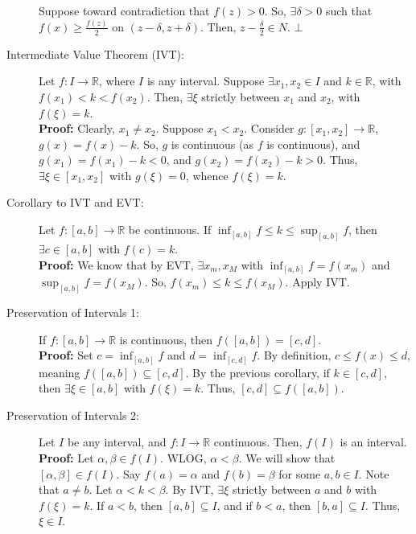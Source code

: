 \documentclass[10pt]{extarticle}
\newcommand{\R}{\mathbb{R}}
\begin{document}
\begin{description}
        Suppose toward contradiction that $f(z) > 0$. So, $\exists \delta > 0$ such that $f(x) \geq \frac{f(z)}{2}$ on $(z-\delta,z+\delta)$. Then, $z-\frac{\delta}{2}\in N$. $\bot$
      \item[Intermediate Value Theorem (IVT):] Let $f: I \rightarrow \R$, where $I$ is any interval. Suppose $\exists x_1,x_2\in I$ and $k\in \R$, with $f(x_1) < k < f(x_2)$. Then, $\exists \xi$ strictly between $x_1$ and $x_2$, with $f(\xi) = k$.\\

        \textbf{Proof:} Clearly, $x_1 \neq x_2$. Suppose $x_1 < x_2$. Consider $g: [x_1,x_2] \rightarrow \R$, $g(x) = f(x) - k$. So, $g$ is continuous (as $f$ is continuous), and $g(x_1) = f(x_1) - k < 0$, and $g(x_2) = f(x_2) - k > 0$. Thus, $\exists \xi \in [x_1,x_2]$ with $g(\xi) = 0$, whence $f(\xi) = k$.
      \item[Corollary to IVT and EVT:] Let $f: [a,b]\rightarrow \R$ be continuous. If $\inf_{[a,b]} f \leq k\leq \sup_{[a,b]} f$, then $\exists c\in [a,b]$ with $f(c) = k$.\\

        \textbf{Proof:} We know that by EVT, $\exists x_m,x_M$ with $\inf_{[a,b]} f = f(x_m)$ and $\sup_{[a,b]} f = f(x_M)$. So, $f(x_m) \leq k \leq f(x_M)$. Apply IVT.
      \item[Preservation of Intervals 1:] If $f:[a,b]\rightarrow \R$ is continuous, then $f([a,b]) = [c,d]$.\\

        \textbf{Proof:} Set $c = \inf_{[a,b]} f$ and $d = \inf_{[c,d]} f$. By definition, $c\leq f(x) \leq d$, meaning $f([a,b])\subseteq [c,d]$. By the previous corollary, if $k\in [c,d]$, then $\exists \xi \in [a,b]$ with $f(\xi)= k$. Thus, $[c,d] \subseteq f([a,b])$.
      \item[Preservation of Intervals 2:] Let $I$ be any interval, and $f: I\rightarrow \R$ continuous. Then, $f(I)$ is an interval.\\

        \textbf{Proof:} Let $\alpha,\beta \in f(I)$. WLOG, $\alpha < \beta$. We will show that $[\alpha,\beta]\in f(I)$. Say $f(a) = \alpha$ and $f(b) = \beta$ for some $a,b\in I$. Note that $a\neq b$. Let $\alpha < k < \beta$. By IVT, $\exists \xi$ strictly between $a$ and $b$ with $f(\xi) = k$. If $a < b$, then $[a,b]\subseteq I$, and if $b < a$, then $[b,a] \subseteq I$. Thus, $\xi\in I$.
    \end{description}
\end{document}
